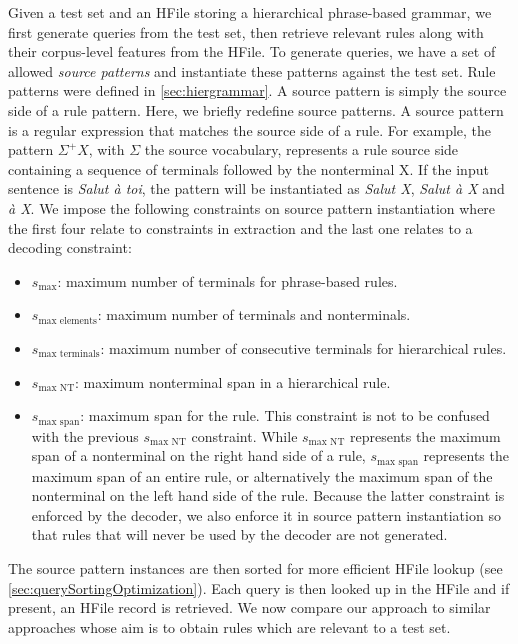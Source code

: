 Given a test set and an HFile storing a hierarchical phrase-based grammar, we
first generate queries from the test set, then retrieve relevant rules along
with their corpus-level features from the HFile. To generate queries, we have a set
of allowed \emph{source patterns} and instantiate these patterns against the
test set. Rule patterns were defined in \autoref{sec:hiergrammar}.
A source pattern is simply the source side of a rule pattern.
Here, we briefly redefine source patterns.
A source pattern is a regular expression that matches
the source side of a rule. For example, the
pattern $\Sigma^+X$, with $\Sigma$ the source vocabulary,
represents a rule source side containing a sequence of
terminals followed by the nonterminal X. If the input sentence is
\emph{Salut à toi}, the pattern will be instantiated as \emph{Salut X},
\emph{Salut à X} and \emph{à X}. We impose the following constraints on source pattern
instantiation where the first four relate to constraints in extraction and the
last one relates to a decoding constraint:
%
\begin{itemize}
  \item $s_{\text{max}}$: maximum number of terminals for phrase-based rules.
  \item $s_{\text{max elements}}$: maximum number of terminals and nonterminals.
  \item $s_{\text{max terminals}}$: maximum number of consecutive terminals for
    hierarchical rules.
  \item $s_{\text{max NT}}$: maximum nonterminal span in a hierarchical
    rule.
  \item $s_{\text{max span}}$: maximum span for the rule. This constraint
    is not to be confused with the previous $s_{\text{max NT}}$ constraint.
    While $s_{\text{max NT}}$ represents the maximum span of a nonterminal
    on the right hand side of a rule, $s_{\text{max span}}$ represents the maximum span
    of an entire rule, or alternatively the maximum span of the nonterminal on the left
    hand side of the rule. Because the latter constraint is enforced by the decoder, we
    also enforce it in source pattern instantiation so that rules that will
    never be used by the decoder are not generated.
\end{itemize}
%
The source pattern instances are then sorted for more efficient HFile lookup
(see \autoref{sec:querySortingOptimization}). Each
query is then looked up in the HFile and if
present, an HFile record is retrieved.
We now compare our approach to similar approaches whose aim is
to obtain rules which are relevant to a test set.

